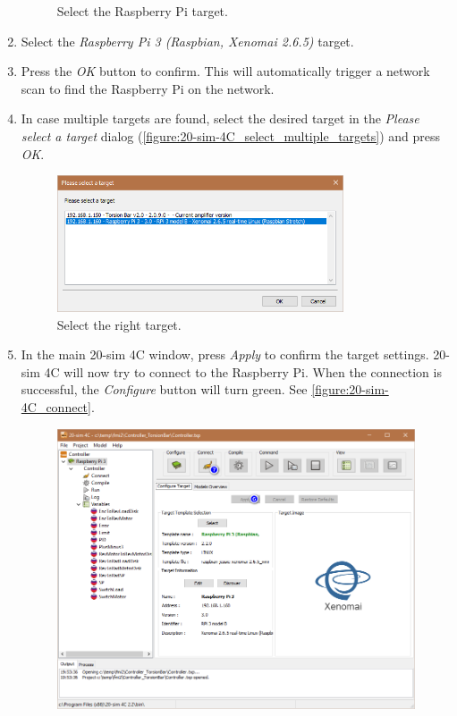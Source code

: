 \begin{enumerate}
\begin{figure}[hpt]
	\caption{Select the Raspberry Pi target.}
	\label{figure:20-sim-4C_select_raspberry_pi}
\end{figure}
%
\item Select the \textit{Raspberry Pi 3 (Raspbian, Xenomai 2.6.5)} target.
\item Press the \textit{OK} button to confirm. This will automatically trigger a network scan to find the Raspberry Pi on the network.
\item In case multiple targets are found, select the desired target in the \textit{Please select a target} dialog (\autoref{figure:20-sim-4C_select_multiple_targets}) and press \textit{OK}.
%
%
%
\begin{figure}[hpt]
	\centerline{\includegraphics[width=0.8\textwidth]{figures/20-sim-4C_select_multiple_targets.png}}
	\caption{Select the right target.}
	\label{figure:20-sim-4C_select_multiple_targets}
\end{figure}
%
\item In the main 20-sim 4C window, press \textit{Apply} to confirm the target settings.  20-sim 4C will now try to connect to the Raspberry Pi. When the connection is successful, the \textit{Configure} button will turn green.
  See \autoref{figure:20-sim-4C_connect}.
%
\begin{figure}[hpt]
	\centerline{\includegraphics[width=\textwidth]{figures/20-sim-4C_connect.png}}

\end{figure}
\end{enumerate}
